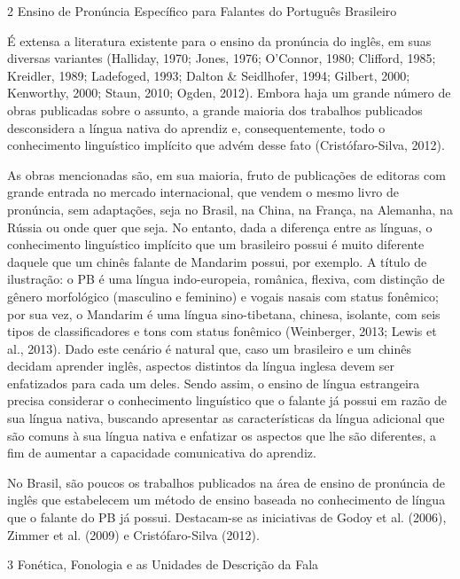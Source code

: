 2 Ensino de Pron\'uncia Espec\'ifico para Falantes do Portugu\^es Brasileiro

\'E extensa a literatura existente para o ensino da pron\'uncia do ingl\^es,
em suas diversas variantes (Halliday, 1970; Jones, 1976; O'Connor, 1980;
Clifford, 1985; Kreidler, 1989; Ladefoged, 1993; Dalton \& Seidlhofer,
1994; Gilbert, 2000; Kenworthy, 2000; Staun, 2010; Ogden, 2012). Embora
haja um grande n\'umero de obras publicadas sobre o assunto, a grande
maioria dos trabalhos publicados desconsidera a l\'ingua nativa do
aprendiz e, consequentemente, todo o conhecimento lingu\'istico impl\'icito
que adv\'em desse fato (Crist\'ofaro-Silva, 2012).

As obras mencionadas s\~ao, em sua  maioria,  fruto  de  publica\c{c}\~oes  de
editoras com grande entrada no mercado internacional, que vendem o mesmo
livro de pron\'uncia, sem adapta\c{c}\~oes, seja no Brasil, na China, na Fran\c{c}a,
na Alemanha, na R\'ussia ou onde quer que seja. No entanto, dada a
diferen\c{c}a entre as l\'inguas, o conhecimento lingu\'istico impl\'icito que um
brasileiro possui \'e muito diferente daquele que um chin\^es falante de
Mandarim possui, por exemplo. A t\'itulo de ilustra\c{c}\~ao: o PB \'e uma l\'ingua
indo-europeia, rom\^anica, flexiva, com distin\c{c}\~ao de g\^enero morfol\'ogico
(masculino e feminino) e vogais nasais com status fon\^emico; por sua vez,
o Mandarim \'e uma l\'ingua sino-tibetana, chinesa, isolante, com seis tipos
de classificadores e tons com status fon\^emico (Weinberger, 2013; Lewis
et al., 2013). Dado este cen\'ario \'e natural que, caso um brasileiro e um
chin\^es decidam aprender ingl\^es, aspectos distintos da l\'ingua inglesa
devem ser enfatizados para cada um deles. Sendo assim, o ensino de
l\'ingua estrangeira precisa considerar o conhecimento lingu\'istico que o
falante j\'a possui em raz\~ao de sua l\'ingua nativa, buscando apresentar as
caracter\'isticas da l\'ingua adicional que s\~ao comuns à sua l\'ingua nativa e
enfatizar os aspectos que lhe s\~ao diferentes, a fim de aumentar a
capacidade comunicativa do aprendiz.

No Brasil, s\~ao poucos os trabalhos publicados na  \'area  de  ensino  de
pron\'uncia de ingl\^es que estabelecem um m\'etodo de ensino baseada no
conhecimento de l\'ingua que o falante do PB j\'a possui. Destacam-se as
iniciativas de Godoy et al. (2006), Zimmer et al. (2009) e
Crist\'ofaro-Silva (2012).

3 Fon\'etica, Fonologia e as Unidades de Descri\c{c}\~ao da Fala


